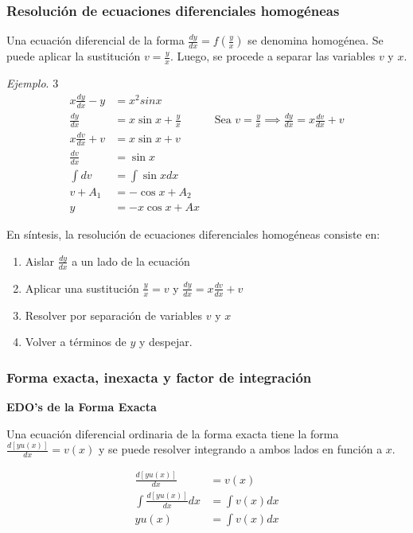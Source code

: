 \documentclass[spanish,12pt]{article}
\newcommand{\dydx}{\frac{dy}{dx}}
\begin{document}
\subsubsection{Resolución de ecuaciones diferenciales homogéneas}

Una ecuación diferencial de la forma $\dydx=f(\frac{y}{x})$ se denomina homogénea. Se puede aplicar la sustitución $v=\frac{y}{x}$. Luego, se procede a separar las variables $v$ y $x$.

\textit{Ejemplo}. 3
\begin{align*}
    x\dydx-y&=x^2sin{x}\\
    \dydx&=x\sin{x}+\frac{y}{x}\quad\quad\quad\text{Sea }v=\frac{y}{x}\implies \dydx=x\frac{dv}{dx}+v\\
    x\frac{dv}{dx}+v&=x\sin{x}+v\\
    \frac{dv}{dx}&=\sin{x}\\
    \int dv&=\int\sin{x}dx\\
    v+A_1&=-\cos{x}+A_2\\
    y&=-x\cos{x}+Ax
\end{align*}

En síntesis, la resolución de ecuaciones diferenciales homogéneas consiste en:
\begin{enumerate}
    \item Aislar $\dydx$ a un lado de la ecuación
    \item Aplicar una sustitución $\frac{y}{x}=v$ y $\dydx=x\frac{dv}{dx}+v$
    \item Resolver por separación de variables $v$ y $x$
    \item Volver a términos de $y$ y despejar.
\end{enumerate}

\subsubsection{Forma exacta, inexacta y factor de integración}
\textbf{EDO's de la Forma Exacta}

Una ecuación diferencial ordinaria de la forma exacta tiene la forma $\frac{d[yu(x)]}{dx}=v(x)$ y se puede resolver integrando a ambos lados en función a $x$.

\begin{align*}
    \frac{d[yu(x)]}{dx}&=v(x)\\
    \int\frac{d[yu(x)]}{dx}dx&=\int v(x)dx\\
    yu(x)&=\int v(x)dx
\end{align*}
\end{document}
